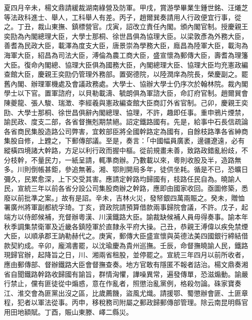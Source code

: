 \begin{pinyinscope}
夏四月辛未，楊文鼎請緩裁湖南綠營及防軍。甲戌，賞游學畢業生鍾世銘、汪爔芝等法政科進士、舉人，工科舉人有差。丙子，趙爾巽奏請用人行政便宜行事，從之。丁丑，裁山東撫、鎮標營官。戊寅，詔改立責任內閣。頒內閣官制。授慶親王奕劻為內閣總理大臣，大學士那桐、徐世昌俱為協理大臣。以梁敦彥為外務大臣，善耆為民政大臣，載澤為度支大臣，唐景崇為學務大臣，廕昌為陸軍大臣，載洵為海軍大臣，紹昌為司法大臣，溥倫為農工商大臣，盛宣懷為郵傳大臣，壽耆為理籓大臣。復命內閣總、協理大臣俱為國務大臣，內閣總理大臣、協理大臣均充憲政編查館大臣，慶親王奕劻仍管理外務部。置弼德院，以陸潤庠為院長，榮慶副之。罷舊內閣、辦理軍機處及會議政務處。大學士、協辦大學士仍序次於翰林院。裁內閣學士以下官。置軍諮府，以貝勒載濤、毓朗俱為軍諮大臣，命訂府官制。趙爾巽會陳夔龍、張人駿、瑞澂、李經羲與憲政編查館大臣商訂外省官制。己卯，慶親王奕劻、大學士那桐、徐世昌俱辭內閣總理、協理，不許，趣即任事。重申鴉片煙禁，諭民政、度支二部，各省督撫剋期禁絕。詔定鐵路國有。先是，給事中石長信疏論各省商民集股造路公司弊害，宜敕部臣將全國幹路定為國有，自餘枝路準各省紳商集股自修，上韙之，下郵傳部議。至是，奏言：「中國幅員廣袤，邊疆遼遠，必有縱橫四境諸大幹路，方足以利行政而握中樞。從前規畫未善，致路政錯亂紛歧，不分枝幹，不量民力，一紙呈請，輒準商辦。乃數載以來，粵則收股及半，造路無多。川則倒帳甚鉅，參追無著。湘、鄂則開局多年，徒供坐耗。循是不已，恐曠日彌久，民累愈深，上下交受其害。應請定幹路均歸國有，枝路任民自為。曉諭人民，宣統三年以前各省分設公司集股商辦之幹路，應即由國家收回。亟圖修築，悉廢以前批準之案。」故有是詔。辛未，吉林火災，發帑銀四萬兩賑之。癸未，贈恤署廣州將軍副都統孚琦。丁亥，資政院請預算借款兩事歸院會議，不許。戊子，起端方以侍郎候補，充督辦粵漢、川漢鐵路大臣。諭裁缺候補人員毋得奏事。諭本年秋季調集禁衛軍及近畿各鎮陸軍於直隸永平府大操。己丑，恭親王溥偉以疾免禁煙大臣，以順承郡王訥勒赫代之。庚寅，郵傳大臣盛宣懷與英德法美四國銀行締結借款契約成。辛卯，龐鴻書罷，以沈瑜慶為貴州巡撫。壬辰，命督撫曉諭人民，鐵路現歸官辦，起降旨之日，川、湘兩省租股，並停罷之。宣統三年四月以前所收者，應由郵傳部、督辦鐵路大臣會督撫查奏。地方官敢有隱匿不報者詰治。楊文鼎奏湘省自聞鐵路幹路收歸國有諭旨，群情洶懼，譁噪異常，遍發傳單，恐滋煽動。諭嚴行禁止，儻有匪徒從中煽惑，意在作亂者，照懲治亂黨例，格殺勿論。硃家寶奏江、淮交會為匪黨出沒之區，比歲薦饑，盜風尤熾。請援鄂、蜀懲辦會匪、土匪章程，犯者以軍法從事。丙申，移稅務司附屬之郵政歸郵傳部管理。除云南昆明縣官用田地額賦。丁酉，賑山東滕、嶧二縣災。


\end{pinyinscope}
